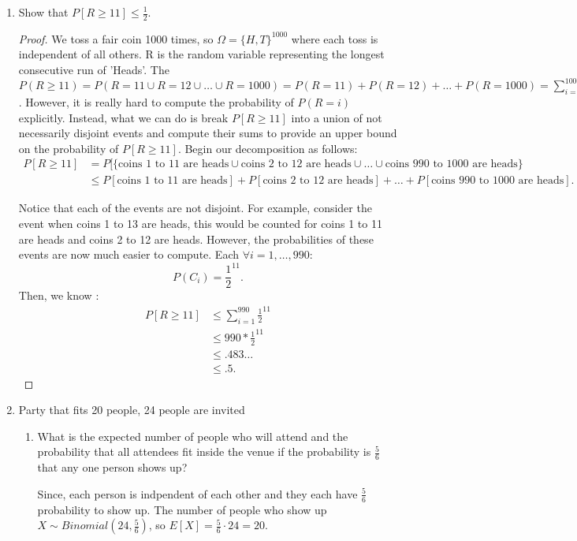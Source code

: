 \documentclass[a4paper]{article}
\begin{document}
\begin{enumerate}
\begin{proof}
\begin{align*}
                                &= n(\frac{29}{36})
      .\end{align*}
    \end{proof}
  \item Show that $P[R \geq 11] \leq \frac{1}{2}$.
    \begin{proof}
      We toss a fair coin 1000 times, so $\Omega = \{H,T\}^{1000}$ where each toss is independent of all others. 
      R is the random variable representing the longest consecutive run of 'Heads'. The $P(R \geq 11) = P(R = 11 \cup
      R=12 \cup \ldots \cup R=1000) = P(R=11) + P(R=12) + \ldots + P(R=1000) = \sum_{i=11}^{1000} P(R=i)$. However,
      it is really hard to compute the probability of $P(R=i)$ explicitly. Instead, what we can do is break 
      $P[R\geq 11]$ into a union of not necessarily disjoint events and compute their sums to provide an
      upper bound on the probability of $P[R \geq 11]$. Begin our decomposition as follows:
      \begin{align*}
        P[R \geq 11] &= P[\{\text{coins 1 to 11 are heads} \cup \text{coins 2 to 12 are heads} \cup \ldots \cup \text{coins 990 to 1000 are heads} \} \\ 
                     &\leq P[\text{coins 1 to 11 are heads}] + P[\text{coins 2 to 12 are heads}] + \ldots + P[\text{coins 990 to 1000 are heads}] 
      .\end{align*}
              
      Notice that each of the events are not disjoint. For example, consider the event when coins 1 to 13 are heads, this
      would be counted for coins 1 to 11 are heads and coins 2 to 12 are heads. However, the probabilities of these
      events are now much easier to compute. Each $\forall i = 1,\ldots,990$:
       \[
      P(C_i) = \frac{1}{2}^{11}
      .\] 
      Then, we know :
      \begin{align*}
        P[R \geq 11] &\leq \sum_{i=1}^{990}\frac{1}{2}^{11} \\
                     &\leq 990 * \frac{1}{2}^{11} \\
                     &\leq .483\ldots \\
                     &\leq .5
       .\end{align*}
     \end{proof}
  \item Party that fits 20 people, 24 people are invited
    \begin{enumerate}
      \item What is the expected number of people who will attend and the probability that all attendees fit
        inside the venue if the probability is $\frac{5}{6}$ that any one person shows up? 
        \begin{note}
          Since, each person is indpendent of each other and they each have $\frac{5}{6}$ probability to show up.
          The number of people who show up $X \sim Binomial(24, \frac{5}{6})$, so $E[X] = \frac{5}{6} \cdot 24 = 20$. \\


\end{note}
\end{enumerate}
\end{enumerate}
\end{document}
